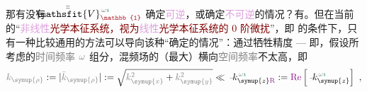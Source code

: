那有没有 $\Xint{\mathcolor{gray}{-}}{25}{\bar{\bar{\mathsfit{V}}}}^{\;\! \mathcolor{gray}{\omega} \textcolor{PineGreen}{\imath}}_{\textcolor{Maroon}{\mathbb{1}}}$ 确定\textcolor{Plum}{可逆}，或确定\textcolor{Plum}{不可逆}的情况？有。但在当前的“\textcolor{Maroon}{\textcolor{Plum}{非线性}光学本征系统，视为\textcolor{Plum}{线性}光学本征系统的 \textcolor{NavyBlue}{0 阶微扰}}”，即  的条件下，只有一种比较通用的方法可以导向该种“确定的情况”：通过牺牲精度 --- 即，假设所考虑的\textcolor{gray}{时间频率} $\mathcolor{gray}{\omega}$ 组分，混频场的（最大）横向\textcolor{gray}{空间频率}不太高，即
\begin{align} \label{eq:k_rho<<k_z}
	\mathcolor{gray}{k_{\symup{\rho}}} := \lvert \mathcolor{gray}{\bar{k}_{\symup{\rho}}} \rvert := \sqrt{ \mathcolor{gray}{k^2_{\symup{x}}} + \mathcolor{gray}{k^2_{\symup{y}}} } \ll \Xint{\begin{smallmatrix} ~ \\ {}^{}_{\mathcolor{gray}{-}} \\ ~ \end{smallmatrix}}{15}{k}_{\symup{z} \textcolor{Plum}{\text{R}}}^{\;\! \mathcolor{gray}{\omega} \textcolor{PineGreen}{\imath}} := \textcolor{Plum}{\text{Re}} \left[ \Xint{\begin{smallmatrix} ~ \\ {}^{}_{\mathcolor{gray}{-}} \\ ~ \end{smallmatrix}}{15}{k}_{\symup{z}}^{\;\! \mathcolor{gray}{\omega} \textcolor{PineGreen}{\imath}} \right] ~,
\end{align}
